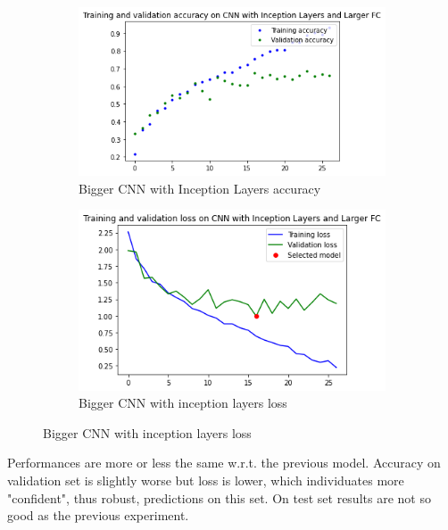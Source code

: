 \medskip


\begin{figure}[H]
	\begin{subfigure}{0.5\textwidth}
		\includegraphics[width=0.9\linewidth]{img/scratch/larger_il_acc.png} 
		\caption{Bigger CNN with Inception Layers accuracy}
		\label{fig:BiggerInceptionLayeracc}
	\end{subfigure}
	\begin{subfigure}{0.5\textwidth}
		\includegraphics[width=0.9\linewidth]{img/scratch/larger_il_loss.png}
		\caption{Bigger CNN with inception layers loss}
		\label{fig:BiggerInceptionLayerloss}
	\end{subfigure}
\end{figure}

\medskip

\noindent Performances are more or less the same w.r.t. the previous model. Accuracy on validation set is slightly worse but loss is lower, which individuates more "confident", thus robust, predictions on this set. On test set results are not so good as the previous experiment.

